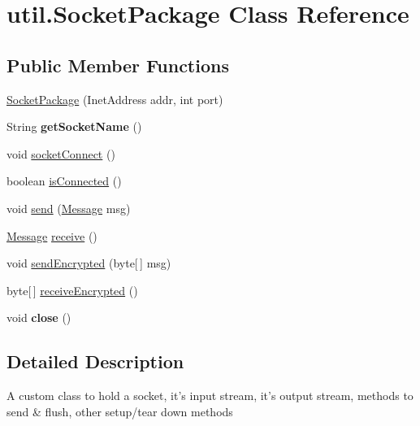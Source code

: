 \hypertarget{classutil_1_1_socket_package}{
\section{util.\-Socket\-Package \-Class \-Reference}
\label{classutil_1_1_socket_package}
}
\subsection*{\-Public \-Member \-Functions}
\begin{DoxyCompactItemize}
\item 
\hyperlink{classutil_1_1_socket_package_a2b57aef045817996aa41173d18d310d0}{\-Socket\-Package} (\-Inet\-Address addr, int port)
\item 
\hypertarget{classutil_1_1_socket_package_a11fbf1fa46cbb85f0e60f1127e767520}{
\-String {\bfseries get\-Socket\-Name} ()}
\label{classutil_1_1_socket_package_a11fbf1fa46cbb85f0e60f1127e767520}

\item 
void \hyperlink{classutil_1_1_socket_package_a0a5918c1e6b5b977941e89eea2a1ab4c}{socket\-Connect} ()
\item 
boolean \hyperlink{classutil_1_1_socket_package_a822900a5ad51d15d5a4b13dfa9243de7}{is\-Connected} ()
\item 
void \hyperlink{classutil_1_1_socket_package_a2716eaeec4325d54180844cd94e77b38}{send} (\hyperlink{classstorage_1_1_message}{\-Message} msg)
\item 
\hyperlink{classstorage_1_1_message}{\-Message} \hyperlink{classutil_1_1_socket_package_a2ab17a2eda4e53fec4c08f733fa56d54}{receive} ()
\item 
void \hyperlink{classutil_1_1_socket_package_a13ec202e418ffb5920b793e0f393e1b9}{send\-Encrypted} (byte\mbox{[}$\,$\mbox{]} msg)
\item 
byte\mbox{[}$\,$\mbox{]} \hyperlink{classutil_1_1_socket_package_a748e1f04fbd883e9b43f9dfa4d56ef64}{receive\-Encrypted} ()
\item 
\hypertarget{classutil_1_1_socket_package_a663b0a426ab352f1ad2b8a4900375b1d}{
void {\bfseries close} ()}
\label{classutil_1_1_socket_package_a663b0a426ab352f1ad2b8a4900375b1d}

\end{DoxyCompactItemize}


\subsection{\-Detailed \-Description}
\-A custom class to hold a socket, it's input stream, it's output stream, methods to send \& flush, other setup/tear down methods 

